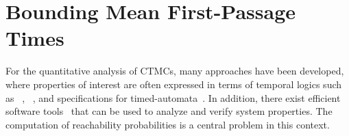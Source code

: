\chapter{Bounding Mean First-Passage Times}\label{ch:MFPT}


For the quantitative analysis of \acp{CTMC}, many   approaches have been
developed, where properties of interest are often expressed in terms
of temporal logics such as
~\parencite{aziz1996verifying,baier2000model,baier2003model,spieler2014model},
~\parencite{chen2011time},
and specifications for
timed-automata~\parencite{chen2009quantitative,mikeev2013fly}.
In addition, there exist
efficient software
tools~\parencite{hinton2006prism,kwiatkowska2011prism,dehnert2017storm}
that can be used to analyze and verify system properties.
The computation of reachability probabilities is a central problem in
this context.

